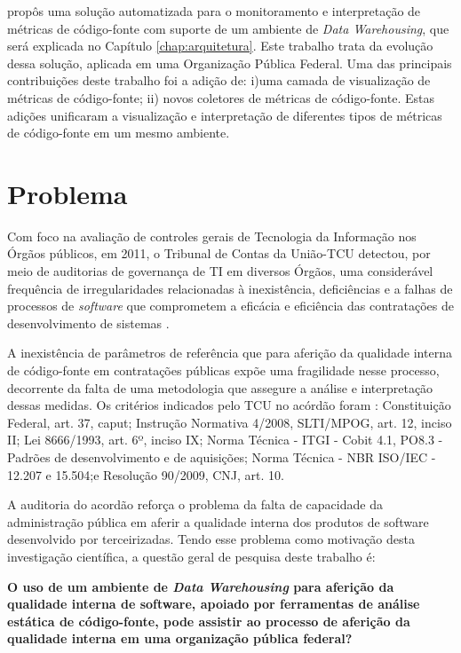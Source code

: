  propôs uma solução automatizada para o monitoramento e interpretação de métricas de código-fonte com suporte de um ambiente de \textit{Data Warehousing}, que será explicada no Capítulo \ref{chap:arquitetura}. Este trabalho trata da evolução dessa solução, aplicada em uma Organização Pública Federal. Uma das principais contribuições deste trabalho foi a adição de: i)uma camada de visualização de métricas de código-fonte; ii) novos coletores de métricas de código-fonte. Estas adições  unificaram a visualização e interpretação de diferentes tipos de métricas de código-fonte em um mesmo ambiente.  


\section{Problema}
\label{problema} 

Com foco na avaliação de controles gerais de Tecnologia da Informação nos Órgãos públicos, em 2011, o Tribunal de Contas da União-TCU detectou, por meio de auditorias de governança de TI em diversos Órgãos, uma considerável frequência de irregularidades relacionadas à inexistência, deficiências e a falhas de processos de \textit{software} que comprometem a eficácia e eficiência das contratações de desenvolvimento de sistemas \cite{Acordao381_2011}. 

A inexistência de parâmetros de referência que para aferição da qualidade interna de código-fonte em contratações públicas expõe uma fragilidade nesse processo, decorrente da falta de uma metodologia que assegure a análise e interpretação dessas medidas. Os critérios indicados pelo TCU no acórdão \cite{Acordao381_2011} foram : Constituição Federal, art. 37, caput; Instrução Normativa 4/2008, SLTI/MPOG, art. 12, inciso II; Lei 8666/1993, art. 6º, inciso IX; Norma Técnica - ITGI - Cobit 4.1, PO8.3 - Padrões de desenvolvimento e de aquisições; Norma Técnica - NBR ISO/IEC - 12.207 e 15.504;e Resolução 90/2009, CNJ, art. 10. 

A auditoria do acordão \cite{Acordao381_2011} reforça o problema da falta de capacidade da administração pública em aferir a qualidade interna dos produtos de software desenvolvido por terceirizadas. Tendo esse problema  como motivação desta investigação científica, a questão geral de pesquisa deste trabalho é:

\textbf{O uso de um ambiente de \textit{Data Warehousing} para aferição da qualidade interna de software, apoiado por ferramentas de análise estática de código-fonte,  pode assistir ao processo de aferição da qualidade interna em uma organização pública federal?}


